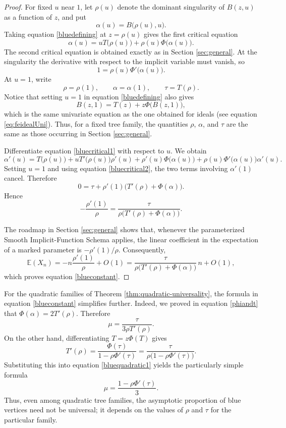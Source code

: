 \documentclass[11pt, onesided]{amsart}
\theoremstyle{remark}
\begin{document}
\begin{proof}
For fixed $u$ near $1$, let $\rho(u)$ denote the dominant singularity of
$B(z,u)$ as a function of $z$, and put
\[
\alpha(u)=B\big(\rho(u),u\big).
\]
Taking equation \eqref{bluedefining} at $z=\rho(u)$ gives the first critical equation
\begin{equation}\label{bluecritical1}
\alpha(u)
=
u T\big(\rho(u)\big)+\rho(u)\Phi\big(\alpha(u)\big).
\end{equation}
The second critical equation is obtained exactly as in Section \ref{sec:general}.  At the
singularity the derivative with respect to the implicit variable must vanish,
so
\begin{equation}\label{bluecritical2}
1=\rho(u)\Phi'\big(\alpha(u)\big).
\end{equation}
At $u=1$, write
\[
\rho=\rho(1),\qquad \alpha=\alpha(1),\qquad \tau=T(\rho).
\]
Notice that setting $u=1$ in equation \eqref{bluedefining} also gives
\[
B(z,1)=T(z)+z\Phi\big(B(z,1)\big),
\]
which is the same univariate equation as the one obtained for ideals
(see equation \eqref{eq:feidealUni}). Thus,
for a fixed tree family, the quantities $\rho$, $\alpha$, and $\tau$ are the
same as those occurring in Section \ref{sec:general}.

Differentiate equation \eqref{bluecritical1} with respect to $u$.  We obtain
\[
\alpha'(u)
=
T\big(\rho(u)\big)
+uT'\big(\rho(u)\big)\rho'(u)
+\rho'(u)\Phi\big(\alpha(u)\big)
+\rho(u)\Phi'\big(\alpha(u)\big)\alpha'(u).
\]
Setting $u=1$ and using equation \eqref{bluecritical2}, the two terms involving
$\alpha'(1)$ cancel.  Therefore
\[
0
=
\tau
+\rho'(1)\bigl(T'(\rho)+\Phi(\alpha)\bigr).
\]
Hence
\[
-\frac{\rho'(1)}{\rho}
=
\frac{\tau}
{\rho\bigl(T'(\rho)+\Phi(\alpha)\bigr)}.
\]

The roadmap in Section \ref{sec:general} shows that, whenever the parameterized Smooth
Implicit-Function Schema applies, the linear coefficient in the expectation
of a marked parameter is $-\rho'(1)/\rho$. Consequently,
\[
\mathbb E(X_n)
=
-n\frac{\rho'(1)}{\rho}+O(1)
=
\frac{\tau}
{\rho\bigl(T'(\rho)+\Phi(\alpha)\bigr)}\,n+O(1),
\]
which proves equation \eqref{blueconstant}.
\end{proof}

For the quadratic families of Theorem \ref{thm:quadratic-universality}, the formula in equation
\eqref{blueconstant} simplifies further.  Indeed, we proved in
equation \eqref{phiandt} that $\Phi(\alpha)=2T'(\rho)$.
Therefore
\begin{equation}\label{bluequadratic1}
\mu=\frac{\tau}{3\rho T'(\rho)}.
\end{equation}
On the other hand, differentiating $T=z\Phi(T)$ gives
\[
T'(\rho)
=
\frac{\Phi(\tau)}{1-\rho\Phi'(\tau)}
=
\frac{\tau}{\rho\bigl(1-\rho\Phi'(\tau)\bigr)}.
\]
Substituting this into equation \eqref{bluequadratic1} yields the particularly simple
formula
\begin{equation}\label{bluequadratic2}
{
\mu=\frac{1-\rho\Phi'(\tau)}{3}.
}
\end{equation}
Thus, even among quadratic tree families, the asymptotic proportion of blue
vertices need not be universal; it depends on the values of $\rho$ and
$\tau$ for the particular family.
\end{document}
